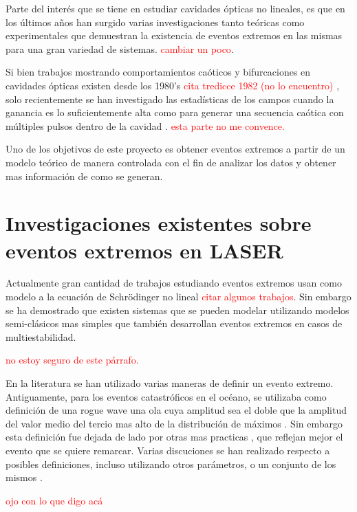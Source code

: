 		Parte del interés que se tiene en estudiar cavidades ópticas no lineales, es que en los últimos años han surgido varias investigaciones tanto teóricas como experimentales que demuestran la existencia de eventos extremos en las mismas para una gran variedad de sistemas.
		\textcolor{red}{cambiar un poco}.
		
		Si bien trabajos mostrando comportamientos caóticos y bifurcaciones en cavidades ópticas existen desde los 1980's \textcolor{red}{cita tredicce 1982 (no lo encuentro)  }  \cite{ikeda:jpa-00222595} ,  solo recientemente se han investigado las estadísticas de los campos cuando la ganancia es lo suficientemente alta como para generar una secuencia caótica con múltiples pulsos dentro de la cavidad \cite{PhysRevE.84.016604}  . \textcolor{red}{esta parte no me convence.} 
		
		Uno de los objetivos de este proyecto es obtener eventos extremos a partir de un modelo teórico   de manera controlada con el fin de analizar los datos y obtener mas información de como se generan.
	
	\section{Investigaciones existentes sobre eventos extremos en LASER}
		
		Actualmente gran cantidad de trabajos estudiando eventos extremos usan como modelo a la ecuación de Schrödinger no lineal \textcolor{red}{citar algunos trabajos}. Sin embargo se ha demostrado que existen sistemas que se pueden modelar utilizando modelos semi-clásicos mas simples que  también desarrollan eventos extremos en casos de multiestabilidad. 
		
		\textcolor{red}{no estoy seguro de este párrafo.}
		
		En la literatura se han utilizado varias maneras de definir un evento extremo. Antiguamente, para los eventos catastróficos en el océano, se utilizaba como definición de una rogue wave una ola cuya amplitud sea el doble que la amplitud del valor medio del tercio mas alto de la distribución de máximos \cite{wave_disaster}. Sin embargo esta definición fue dejada de lado por otras mas practicas , que reflejan mejor el evento que se quiere remarcar. 
		Varias discuciones se han realizado respecto a posibles definiciones, incluso utilizando otros parámetros, o un conjunto de los mismos \cite{Ruban2010} .
		
		
		\textcolor{red}{ojo con  lo que digo acá}
		
